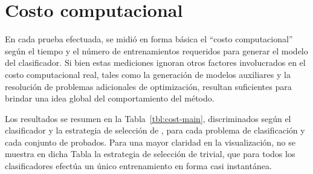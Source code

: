 %
%
\section{Costo computacional}
%
En cada prueba efectuada, se midió en forma básica el ``costo
computacional'' según el tiempo y el número de entrenamientos
requeridos para generar el modelo del clasificador.
Si bien estas mediciones ignoran otros factores involucrados en el
costo computacional real, tales como la generación de modelos
auxiliares y la resolución de problemas adicionales de optimización,
resultan suficientes para brindar una idea global del comportamiento
del método.

Los resultados se resumen en la Tabla~\ref{tbl:cost-main},
discriminados según el clasificador y la estrategia de selección de
, para cada problema de clasificación y cada conjunto de
 probados.
Para una mayor claridad en la visualización, no se muestra en dicha
Tabla la estrategia de selección de  trivial, que para todos
los clasificadores efectúa un único entrenamiento en forma casi
instantánea.
